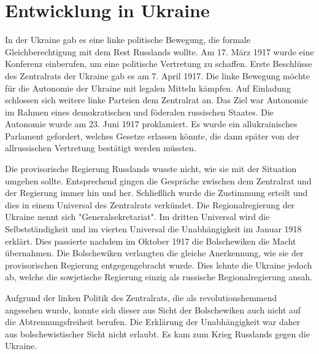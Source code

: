 \documentclass[10pt,a4paper,oneside,ngerman,numbers=noenddot]{scrartcl}
\begin{document}
\section{Entwicklung in Ukraine}

In der Ukraine gab es eine linke politische Bewegung, die formale Gleichberechtigung
mit dem Rest Russlands wollte. Am 17. März 1917 wurde eine Konferenz einberufen,
um eine politische Vertretung zu schaffen. Erste Beschlüsse des Zentralrats
der Ukraine gab es am 7. April 1917. Die linke Bewegung möchte für die Autonomie
der Ukraine mit legalen Mitteln kämpfen. Auf Einladung schlossen sich weitere
linke Parteien dem Zentralrat an. Das Ziel war Autonomie im Rahmen eines
demokratischen und föderalen russischen Staates. Die Autonomie wurde am
23. Juni 1917 proklamiert. Es wurde ein allukrainisches Parlament gefordert,
welches Gesetze erlassen könnte, die dann später von der allrussischen
Vertretung bestätigt werden müssten.

Die provisorische Regierung Russlands wusste nicht, wie sie mit der Situation
umgehen sollte. Entsprechend gingen die Gespräche zwischen dem Zentralrat
und der Regierung immer hin und her. Schließlich wurde die Zustimmung erteilt
und dies in einem Universal des Zentralrats verkündet. Die Regionalregierung der
Ukraine nennt sich "Generalsekretariat". Im dritten Universal wird die
Selbstständigkeit und im vierten Universal die Unabhängigkeit im Januar 1918
erklärt. Dies passierte nachdem im Oktober 1917 die Bolschewiken die Macht
übernahmen. Die Bolschewiken verlangten die gleiche Anerkennung, wie sie
der provisorischen Regierung entgegengebracht wurde. Dies lehnte die Ukraine
jedoch ab, welche die sowjetische Regierung einzig als russische Regionalregierung
ansah.

Aufgrund der linken Politik des Zentralrats, die als revolutionshemmend angesehen wurde,
konnte sich dieser aus Sicht der Bolschewiken auch nicht auf die Abtrennungsfreiheit
berufen. Die Erklärung der Unabhängigkeit war daher aus bolschewistischer Sicht
nicht erlaubt. Es kam zum Krieg Russlands gegen die Ukraine.
\end{document}
